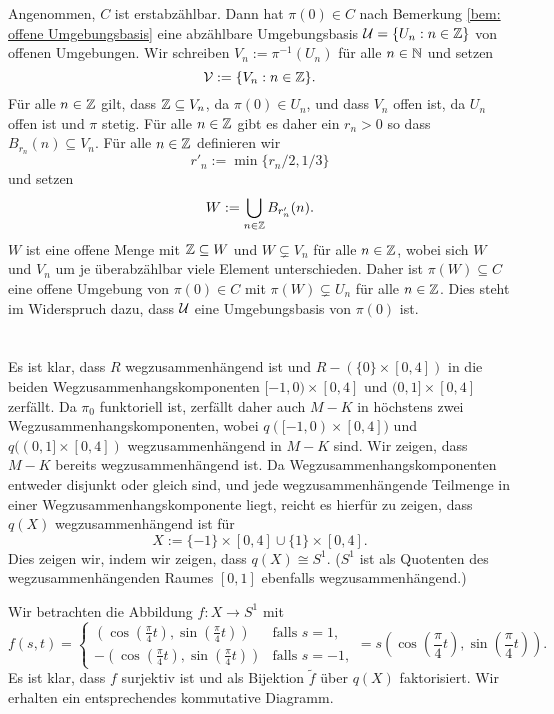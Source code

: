 \documentclass[a4paper,10pt]{article}
\begin{document}
Angenommen, $C$ ist erstabzählbar. Dann hat $\pi(0) \in C$ nach Bemerkung \ref{bem: offene Umgebungsbasis} eine abzählbare Umgebungsbasis $\mathcal{U} = \{U_n : n \in \mathbb{Z}\}$ von offenen Umgebungen. Wir schreiben $V_n := \pi^{-1}(U_n)$ für alle $n \in \mathbb{N}$ und setzen
\[
 \mathcal{V} := \{V_n : n \in \mathbb{Z}\}.
\]
Für alle $n \in \mathbb{Z}$ gilt, dass $\mathbb{Z} \subseteq V_n$, da $\pi(0) \in U_n$, und dass $V_n$ offen ist, da $U_n$ offen ist und $\pi$ stetig. Für alle $n \in \mathbb{Z}$ gibt es daher ein $r_n > 0$ so dass $B_{r_n}(n) \subseteq V_n$. Für alle $n \in \mathbb{Z}$ definieren wir
\[
 r'_n := \min\{r_n/2, 1/3\}
\]
und setzen
\[
 W := \bigcup_{n \in \mathbb{Z}} B_{r'_n}(n).
\]
$W$ ist eine offene Menge mit $\mathbb{Z} \subseteq W$ und $W \subsetneq V_n$ für alle $n \in \mathbb{Z}$, wobei sich $W$ und $V_n$ um je überabzählbar viele Element unterschieden. Daher ist $\pi(W) \subseteq C$ eine offene  Umgebung von $\pi(0) \in C$ mit $\pi(W) \subsetneq U_n$ für alle $n \in \mathbb{Z}$. Dies steht im Widerspruch dazu, dass $\mathcal{U}$ eine Umgebungsbasis von $\pi(0)$ ist.





\section{}


\addtocounter{subsection}{1}


\subsection{}
Es ist klar, dass $R$ wegzusammenhängend ist und $R - (\{0\} \times [0,4])$ in die beiden Wegzusammenhangskomponenten $[-1,0) \times [0,4]$ und $(0,1] \times [0,4]$ zerfällt. Da $\pi_0$ funktoriell ist, zerfällt daher auch $M-K$ in höchstens zwei Wegzusammenhangskomponenten, wobei $q([-1,0) \times [0,4])$ und $q((0,1] \times [0,4])$ wegzu\-sammen\-hängend in $M-K$ sind. Wir zeigen, dass $M-K$ bereits wegzusammenhängend ist. Da Wegzusammenhangskomponenten entweder disjunkt oder gleich sind, und jede wegzusammenhängende Teilmenge in einer Wegzusammenhangskomponente liegt, reicht es hierfür zu zeigen, dass $q(X)$ wegzusammenhängend ist für
\[
 X := \{-1\} \times [0,4] \cup \{1\} \times [0,4].
\]
Dies zeigen wir, indem wir zeigen, dass $q(X) \cong S^1$. ($S^1$ ist als Quotenten des wegzusammenhängenden Raumes $[0,1]$ ebenfalls wegzusammenhängend.)

Wir betrachten die Abbildung $f : X \to S^1$ mit
\[
f(s,t)
=
\begin{cases}
   \left(\cos\left(\frac{\pi}{4}t\right),\sin\left(\frac{\pi}{4}t\right)\right) & \text{falls } s = 1, \\
 - \left(\cos\left(\frac{\pi}{4}t\right),\sin\left(\frac{\pi}{4}t\right)\right) & \text{falls } s = -1,
\end{cases}
=  s \left(\cos\left(\frac{\pi}{4}t\right),\sin\left(\frac{\pi}{4}t\right)\right).
\]
Es ist klar, dass $f$ surjektiv ist und als Bijektion $\tilde{f}$ über $q(X)$ faktorisiert. Wir erhalten ein entsprechendes kommutative Diagramm.
\end{document}
